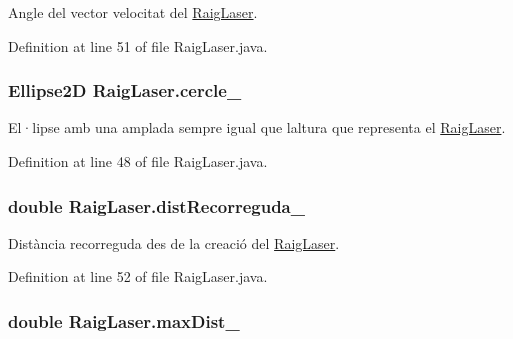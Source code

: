 Angle del vector velocitat del \hyperlink{class_raig_laser}{Raig\+Laser}. 



Definition at line 51 of file Raig\+Laser.\+java.

\hypertarget{class_raig_laser_a48b0b5a92a7424862bf6ebe59c498577}{}
\subsubsection[{cercle\+\_\+}]{\setlength{\rightskip}{0pt plus 5cm}Ellipse2\+D Raig\+Laser.\+cercle\+\_\+\hspace{0.3cm}{\ttfamily [private]}}\label{class_raig_laser_a48b0b5a92a7424862bf6ebe59c498577}


El·lipse amb una amplada sempre igual que l\textquotesingle{}altura que representa el \hyperlink{class_raig_laser}{Raig\+Laser}. 



Definition at line 48 of file Raig\+Laser.\+java.

\hypertarget{class_raig_laser_aecdc87070f24e6116db8f89d61d75b3a}{}
\subsubsection[{dist\+Recorreguda\+\_\+}]{\setlength{\rightskip}{0pt plus 5cm}double Raig\+Laser.\+dist\+Recorreguda\+\_\+\hspace{0.3cm}{\ttfamily [private]}}\label{class_raig_laser_aecdc87070f24e6116db8f89d61d75b3a}


Distància recorreguda des de la creació del \hyperlink{class_raig_laser}{Raig\+Laser}. 



Definition at line 52 of file Raig\+Laser.\+java.

\hypertarget{class_raig_laser_a950579f9b8aec21d629287044a7a65e7}{}
\subsubsection[{max\+Dist\+\_\+}]{\setlength{\rightskip}{0pt plus 5cm}double Raig\+Laser.\+max\+Dist\+\_\+\hspace{0.3cm}{\ttfamily [private]}}\label{class_raig_laser_a950579f9b8aec21d629287044a7a65e7}


